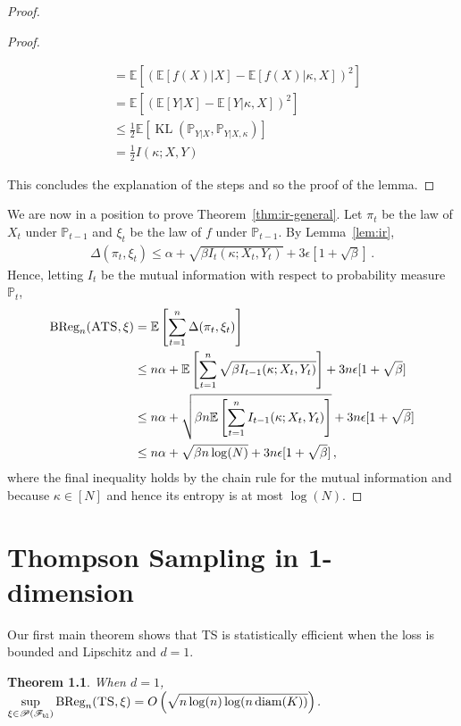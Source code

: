 \documentclass[letter, 12pt]{report}
\newcommand{\pb}{\text{\tiny\texttt{b}}}
\newcommand{\pl}{\text{\tiny\texttt{l}}}
\newcommand{\BReg}{\textrm{BReg}}
\newcommand{\KL}{\operatorname{KL}}
\newcommand{\E}{\mathbb E}
\newcommand{\sF}{\mathscr F}
\newcommand{\sP}{\mathscr P}
\newcommand{\bbP}{\mathbb P}
\newcommand{\diam}{\operatorname{diam}}
\newcommand{\1}{\mathbf{1}}
\newcommand{\ts}{\textsc{TS}\xspace}
\newcommand{\ats}{\textsc{ATS}}
\theoremstyle{plain}
\newtheorem{theorem}{Theorem}
\theoremstyle{definition}
\theoremstyle{remark}
\begin{document}
\begin{proof}
\begin{proof}
\begin{enumerate}
\begin{align*}
                       & = \E[(\E[f(X)|X] - \E[f(X)|\kappa,X])^2]                 \\
                       & = \E[(\E[Y|X] - \E[Y|\kappa,X])^2]                       \\
                       & \leq \frac{1}{2} \E[ \KL(\bbP_{Y|X}, \bbP_{Y|X,\kappa})] \\
                       & = \frac{1}{2} I(\kappa ; X, Y)
                  \end{align*}
        \end{enumerate}
        This concludes the explanation of the steps and so the proof of the lemma.
    \end{proof}

    We are now in a position to prove Theorem~\ref{thm:ir-general}.
    Let $\pi_t$ be the law of $X_t$ under $\bbP_{t-1}$ and $\xi_t$ be the law of $f$ under $\bbP_{t-1}$.
    By Lemma~\ref{lem:ir},
    \begin{align*}
        \Delta(\pi_t, \xi_t) \leq \alpha + \sqrt{\beta I_t(\kappa ; X_t, Y_t)} + 3\epsilon[1 + \sqrt{\beta}]\,.
    \end{align*}
    Hence, letting $I_t$ be the mutual information with respect to probability measure $\bbP_t$,
    \begin{align*}
        \BReg_n(\ats, \xi)
         & = \E\left[\sum_{t=1}^n \Delta(\pi_t, \xi_t)\right]                                                                     \\
         & \leq n \alpha + \E\left[\sum_{t=1}^n \sqrt{\beta I_{t-1}(\kappa ; X_t, Y_t)}\right] + 3n \epsilon[1 + \sqrt{\beta}]    \\
         & \leq n \alpha + \sqrt{\beta n \E\left[\sum_{t=1}^n I_{t-1}(\kappa ; X_t, Y_t)\right]} + 3n \epsilon [1 + \sqrt{\beta}] \\
         & \leq n \alpha + \sqrt{\beta n \log(N)} + 3n \epsilon [1 + \sqrt{\beta}] \,,
    \end{align*}
    where the final inequality holds by the chain rule for the mutual information and because $\kappa \in [N]$ and hence its entropy is at most $\log(N)$.
\end{proof}

\chapter{Thompson Sampling in 1-dimension}
Our first main theorem shows that \ts{} is statistically efficient when the loss is bounded and Lipschitz and $d = 1$.
\begin{theorem}\label{thm:ts-1d}
    When $d = 1$, $\displaystyle \sup_{\xi \in \sP(\sF_{\pb\pl})} \BReg_n(\ts, \xi) = O\left(\sqrt{n \log(n) \log(n \diam(K))}\right)$.
\end{theorem}
\end{document}
